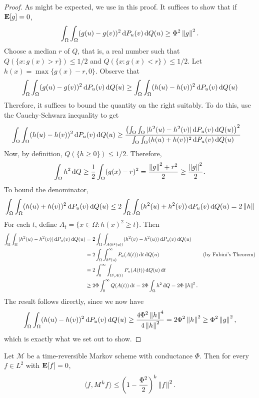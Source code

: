 \begin{proof}
    As might be expected, we use  in this proof. It suffices to show that if $\textbf{E}[g]=0$,
    \[ \int_\Omega \int_\Omega (g(u)-g(v))^2 \operatorname{d}\!{P}_u(v)\operatorname{d}\!{Q}(u) \geq \Phi^2 \left\lVert g\right\rVert^2. \]
    Choose a median $r$ of $Q$, that is, a real number such that $Q(\{x:g(x)>r\}) \leq 1/2$ and $Q(\{x:g(x)<r\}) \leq 1/2$. Let $h(x)=\max\{g(x)-r,0\}$. Observe that
    \[ \int_\Omega \int_\Omega (g(u)-g(v))^2 \operatorname{d}\!{P}_u(v)\operatorname{d}\!{Q}(u) \geq \int_\Omega \int_\Omega (h(u)-h(v))^2 \operatorname{d}\!{P}_u(v)\operatorname{d}\!{Q}(u) \]
    Therefore, it suffices to bound the quantity on the right suitably. To do this, use the Cauchy-Schwarz inequality to get
    \begin{align*}
        \int_\Omega \int_\Omega (h(u)-h(v))^2 \operatorname{d}\!{P}_u(v)\operatorname{d}\!{Q}(u) &\geq \frac{\left(\int_\Omega \int_\Omega |h^2(u)-h^2(v)| \operatorname{d}\!{P}_u(v)\operatorname{d}\!{Q}(u)\right)^2}{\int_\Omega \int_\Omega (h(u)+h(v))^2 \operatorname{d}\!{P}_u(v)\operatorname{d}\!{Q}(u)}
    \end{align*}
    Now, by definition, $Q(\{h\geq 0\})\leq 1/2$. Therefore,
    \[ \int_\Omega h^2\operatorname{d}\!{Q} \geq \frac{1}{2} \int_\Omega (g(x)-r)^2 = \frac{\left\lVert g\right\rVert^2+r^2}{2} \geq \frac{\left\lVert g\right\rVert^2}{2}. \]
    To bound the denominator,
    \[ \int_\Omega \int_\Omega (h(u)+h(v))^2 \operatorname{d}\!{P}_u(v)\operatorname{d}\!{Q}(u) \leq 2 \int_\Omega \int_\Omega (h^2(u)+h^2(v)) \operatorname{d}\!{P}_u(v)\operatorname{d}\!{Q}(u) = 2\left\lVert h\right\rVert \]
    For each $t$, define $A_t = \{x\in\Omega : h(x)^2 \geq t\}$. Then
    \begin{align*}
        \int_\Omega \int_\Omega |h^2(u)-h^2(v)| \d{P}_u(v)\d{Q}(u) &= 2 \int_\Omega \int_{A(h^2(u))} (h^2(v)-h^2(u)) \d{P}_u(v)\d{Q}(u) \\
            &= 2 \int_\Omega \int_{h^2(u)}^\infty P_u(A(t)) \d{t}\d{Q}(u) & (\text{by Fubini's Theorem}) \\
            &= 2 \int_0^\infty \int_{\Omega\setminus A(t)} P_u(A(t)) \d{Q}(u)\d{t} \\
            &\geq 2\Phi \int_0^\infty Q(A(t))\d{t} = 2\Phi \int_\Omega h^2\d{Q} = 2\Phi\norm{h}^2.
    \end{align*}
    The result follows directly, since we now have
    \[ \int_\Omega \int_\Omega (h(u)-h(v))^2 \operatorname{d}\!{P}_u(v)\operatorname{d}\!{Q}(u) \geq \frac{4\Phi^2\left\lVert h\right\rVert^4}{4\left\lVert h\right\rVert^2} = 2\Phi^2\left\lVert h\right\rVert^2 \geq \Phi^2\left\lVert g\right\rVert^2, \]
    which is exactly what we set out to show.
\end{proof}

\begin{corollary}
    Let $\mathcal{M}$ be a time-reversible Markov scheme with conductance $\Phi$. Then for every $f\in L^2$ with $\textbf{E}[f]=0$,
    \[ \langle f,M^k f\rangle \leq \left(1-\frac{\Phi^2}{2}\right)^k\left\lVert f\right\rVert^2. \]
\end{corollary}

